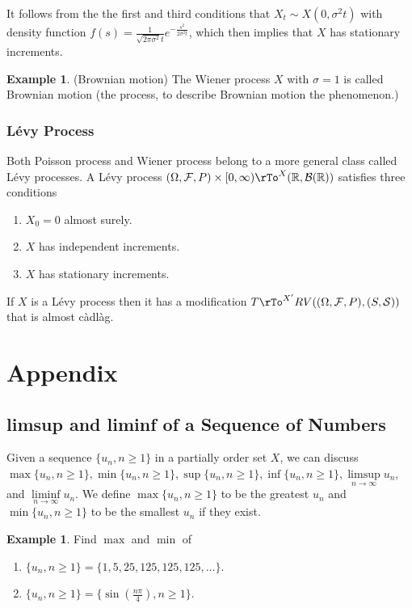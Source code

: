 \documentclass[12pt]{amsart}
\theoremstyle{definition}
\newtheorem{example}[theorem]{Example}
\begin{document}
It follows from the the first and third conditions that $X_t \sim X(0, \sigma^2t)$ with density function $f(s) = \frac{1}{\sqrt{2\pi\sigma^2}t}e^{-\frac{s^2}{2\sigma^2t}}$, which then implies that $X$ has stationary increments.

\begin{example} (Brownian motion) The Wiener process $X$ with $\sigma = 1$ is called Brownian motion (the process, to describe Brownian motion the phenomenon.)
\end{example}

\subsubsection{L\'{e}vy Process} Both Poisson process and Wiener process belong to a more general class called L\'{e}vy processes. A L\'{e}vy process $(\Omega, \mathcal{F}, P) \times [0, \infty) \rTo^X (\mathbb{R}, \mathcal{B}(\mathbb{R}))$ satisfies three conditions
\begin{enumerate}[1.]
\item $X_0 = 0$ almost surely.
\item $X$ has independent increments.
\item $X$ has stationary increments.
\end{enumerate}

If $X$ is a L\'{e}vy process then it has a modification $T \rTo^{X'} RV((\Omega, \mathcal{F}, P),(S, \mathcal{S}))$ that is almost c\`{a}dl\`{a}g.

\section{Appendix}

\subsection{limsup and liminf of a Sequence of Numbers}

Given a sequence $\{u_n, n \geq 1\}$ in a partially order set $X$, we can discuss $\max \{u_n, n \geq 1\}, \min \{u_n, n \geq 1\}, \sup \{u_n, n \geq 1\}, \inf \{u_n, n \geq 1\}, \limsup\limits_{n \to \infty} u_n$, and $\liminf\limits_{n \to \infty} u_n$.
\dfn We define $\max \{u_n, n \geq 1\}$ to be the greatest $u_n$ and $\min \{u_n, n \geq 1\}$ to be the smallest $u_n$ if they exist.

\begin{example} Find $\max$ and $\min$ of
\begin{enumerate}
\item $\{u_n, n \geq 1\} = \{1, 5, 25, 125, 125, 125, \dots\}$.
\item $\{u_n, n \geq 1\} = \{\sin(\frac{n \pi}{4}), n \geq 1\}$.
\end{enumerate}
\end{example}
\end{document}
